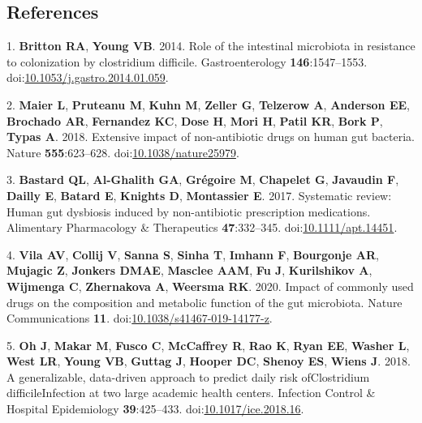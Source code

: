 \documentclass[
  11pt,
]{article}
\begin{document}
\hypertarget{references}{%
\subsection*{References}\label{references}}

\hypertarget{refs}{}
\leavevmode\hypertarget{ref-Britton2014}{}%
1. \textbf{Britton RA}, \textbf{Young VB}. 2014. Role of the intestinal
microbiota in resistance to colonization by clostridium difficile.
Gastroenterology \textbf{146}:1547--1553.
doi:\href{https://doi.org/10.1053/j.gastro.2014.01.059}{10.1053/j.gastro.2014.01.059}.

\leavevmode\hypertarget{ref-Maier2018}{}%
2. \textbf{Maier L}, \textbf{Pruteanu M}, \textbf{Kuhn M},
\textbf{Zeller G}, \textbf{Telzerow A}, \textbf{Anderson EE},
\textbf{Brochado AR}, \textbf{Fernandez KC}, \textbf{Dose H},
\textbf{Mori H}, \textbf{Patil KR}, \textbf{Bork P}, \textbf{Typas A}.
2018. Extensive impact of non-antibiotic drugs on human gut bacteria.
Nature \textbf{555}:623--628.
doi:\href{https://doi.org/10.1038/nature25979}{10.1038/nature25979}.

\leavevmode\hypertarget{ref-LeBastard2017}{}%
3. \textbf{Bastard QL}, \textbf{Al-Ghalith GA}, \textbf{Grégoire M},
\textbf{Chapelet G}, \textbf{Javaudin F}, \textbf{Dailly E},
\textbf{Batard E}, \textbf{Knights D}, \textbf{Montassier E}. 2017.
Systematic review: Human gut dysbiosis induced by non-antibiotic
prescription medications. Alimentary Pharmacology \& Therapeutics
\textbf{47}:332--345.
doi:\href{https://doi.org/10.1111/apt.14451}{10.1111/apt.14451}.

\leavevmode\hypertarget{ref-VichVila2020}{}%
4. \textbf{Vila AV}, \textbf{Collij V}, \textbf{Sanna S}, \textbf{Sinha
T}, \textbf{Imhann F}, \textbf{Bourgonje AR}, \textbf{Mujagic Z},
\textbf{Jonkers DMAE}, \textbf{Masclee AAM}, \textbf{Fu J},
\textbf{Kurilshikov A}, \textbf{Wijmenga C}, \textbf{Zhernakova A},
\textbf{Weersma RK}. 2020. Impact of commonly used drugs on the
composition and metabolic function of the gut microbiota. Nature
Communications \textbf{11}.
doi:\href{https://doi.org/10.1038/s41467-019-14177-z}{10.1038/s41467-019-14177-z}.

\leavevmode\hypertarget{ref-Oh2018}{}%
5. \textbf{Oh J}, \textbf{Makar M}, \textbf{Fusco C}, \textbf{McCaffrey
R}, \textbf{Rao K}, \textbf{Ryan EE}, \textbf{Washer L}, \textbf{West
LR}, \textbf{Young VB}, \textbf{Guttag J}, \textbf{Hooper DC},
\textbf{Shenoy ES}, \textbf{Wiens J}. 2018. A generalizable, data-driven
approach to predict daily risk ofClostridium difficileInfection at two
large academic health centers. Infection Control \& Hospital
Epidemiology \textbf{39}:425--433.
doi:\href{https://doi.org/10.1017/ice.2018.16}{10.1017/ice.2018.16}.
\end{document}
